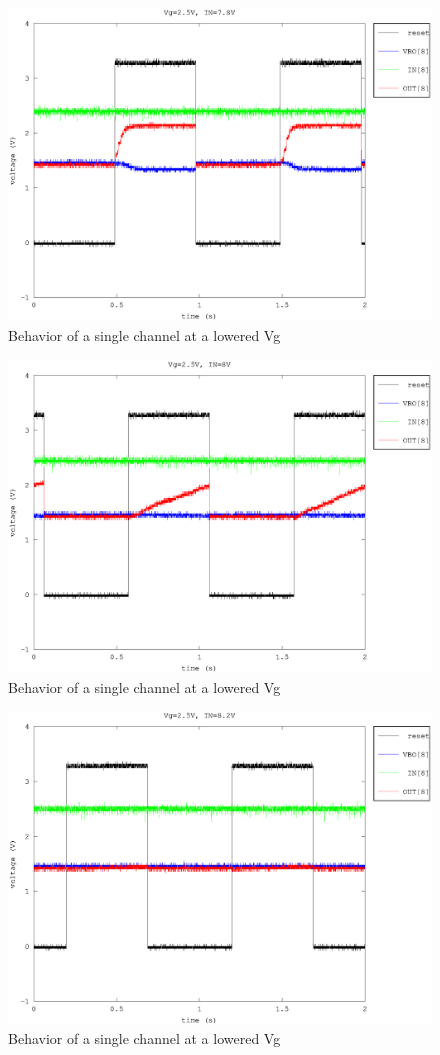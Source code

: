 \documentclass{article}
\begin{document}
\begin{figure}[h]
	\centering
	\includegraphics[width=0.6\linewidth]{fig/Vg_2-5_IN_7-8.eps}
	\caption{Behavior of a single channel at a lowered Vg}
	\label{fig:Vg_2-5_IN_7-8}
\end{figure}

\begin{figure}[h]
	\centering
	\includegraphics[width=0.6\linewidth]{fig/Vg_2-5_IN_8.eps}
	\caption{Behavior of a single channel at a lowered Vg}
	\label{fig:Vg_2-5_IN_8}
\end{figure}

\begin{figure}[h]
	\centering
	\includegraphics[width=0.6\linewidth]{fig/Vg_2-5_IN_8-2.eps}
	\caption{Behavior of a single channel at a lowered Vg}
	\label{fig:Vg_2-5_IN_8-2}
\end{figure}
\end{document}
